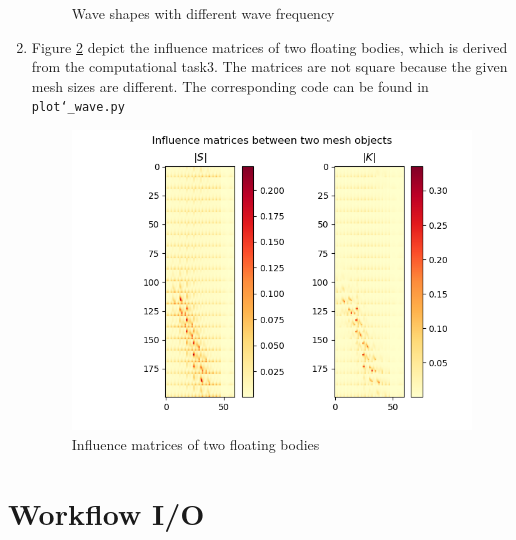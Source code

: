 \documentclass{article}
\begin{document}
\begin{enumerate}
\begin{figure}[h]
        \caption{Wave shapes with different wave frequency}
        \label{fig:plt3}
    \end{figure}
    \item Figure \ref{fig:plt4} depict the influence matrices of two floating bodies, which is derived from the computational task3. The matrices are not square because the given mesh sizes are different. The corresponding code can be found in \texttt{plot\char`_wave.py}
    \begin{figure}[h]
        \centering
        \includegraphics[width=1\textwidth]{img/2_3_infmatrix.png}
        \caption{Influence matrices of two floating bodies}
        \label{fig:plt4}
    \end{figure}

\end{enumerate}

\section{Workflow I/O}


\printbibliography
\end{document}
